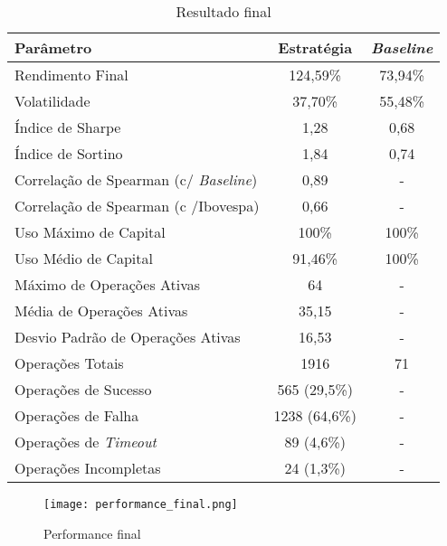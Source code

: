 \begin{table}[h!] %
    \begin{center}
        \begin{tabular}{ l|c|c }
            Parâmetro & Estratégia & \textit{Baseline} \\
            \hline
            Rendimento Final & 124,59\% & 73,94\% \\
            Volatilidade & 37,70\% & 55,48\% \\
            Índice de Sharpe & 1,28 & 0,68 \\
            Índice de Sortino & 1,84 & 0,74 \\
            Correlação de Spearman (c/ \textit{Baseline}) & 0,89 & - \\
            Correlação de Spearman (c /Ibovespa) & 0,66 & - \\
            Uso Máximo de Capital & 100\% & 100\% \\
            Uso Médio de Capital & 91,46\% & 100\% \\
            Máximo de Operações Ativas & 64 & - \\
            Média de Operações Ativas & 35,15 & - \\
            Desvio Padrão de Operações Ativas & 16,53 & -\\
            Operações Totais & 1916 & 71 \\
            Operações de Sucesso & 565 (29,5\%) & - \\
            Operações de Falha & 1238 (64,6\%) & - \\
            Operações de \textit{Timeout} & 89 (4,6\%) & - \\
            Operações Incompletas & 24 (1,3\%) & - \\
        \end{tabular}
        \caption{Resultado final}
        \label{tab:13}
    \end{center}
\end{table}

\begin{figure}[!htb]
    \texttt{[image: performance\_final.png]}
    \centering
    \caption{Performance final}
    \label{fig:250}
\end{figure}
